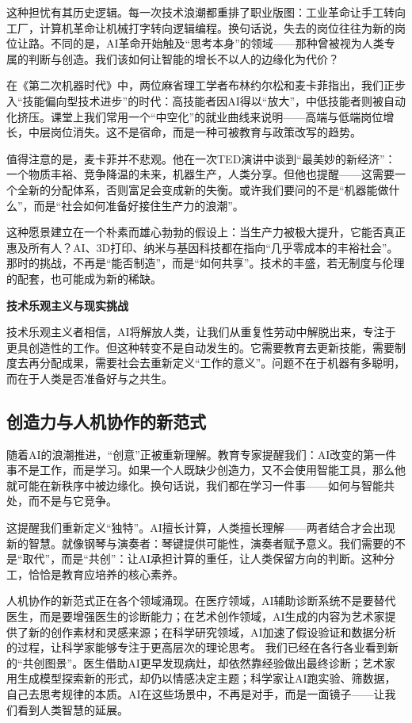 这种担忧有其历史逻辑。每一次技术浪潮都重排了职业版图：工业革命让手工转向工厂，计算机革命让机械打字转向逻辑编程。换句话说，失去的岗位往往为新的岗位让路。不同的是，AI革命开始触及“思考本身”的领域——那种曾被视为人类专属的判断与创造。我们该如何让智能的增长不以人的边缘化为代价？

在《第二次机器时代》中，两位麻省理工学者布林约尔松和麦卡菲指出，我们正步入“技能偏向型技术进步”的时代：高技能者因AI得以“放大”，中低技能者则被自动化挤压。课堂上我们常用一个“中空化”的就业曲线来说明——高端与低端岗位增长，中层岗位消失。这不是宿命，而是一种可被教育与政策改写的趋势。

值得注意的是，麦卡菲并不悲观。他在一次TED演讲中谈到“最美妙的新经济”：一个物质丰裕、竞争降温的未来，机器生产，人类分享。但他也提醒——这需要一个全新的分配体系，否则富足会变成新的失衡。或许我们要问的不是“机器能做什么”，而是“社会如何准备好接住生产力的浪潮”。

这种愿景建立在一个朴素而雄心勃勃的假设上：当生产力被极大提升，它能否真正惠及所有人？AI、3D打印、纳米与基因科技都在指向“几乎零成本的丰裕社会”。那时的挑战，不再是“能否制造”，而是“如何共享”。技术的丰盛，若无制度与伦理的配套，也可能成为新的稀缺。

{\bf 技术乐观主义与现实挑战}

技术乐观主义者相信，AI将解放人类，让我们从重复性劳动中解脱出来，专注于更具创造性的工作。但这种转变不是自动发生的。它需要教育去更新技能，需要制度去再分配成果，需要社会去重新定义“工作的意义”。问题不在于机器有多聪明，而在于人类是否准备好与之共生。

\subsection{创造力与人机协作的新范式}

随着AI的浪潮推进，“创意”正被重新理解。教育专家提醒我们：AI改变的第一件事不是工作，而是学习。如果一个人既缺少创造力，又不会使用智能工具，那么他就可能在新秩序中被边缘化。换句话说，我们都在学习一件事——如何与智能共处，而不是与它竞争。

这提醒我们重新定义“独特”。AI擅长计算，人类擅长理解——两者结合才会出现新的智慧。就像钢琴与演奏者：琴键提供可能性，演奏者赋予意义。我们需要的不是“取代”，而是“共创”：让AI承担计算的重任，让人类保留方向的判断。这种分工，恰恰是教育应培养的核心素养。

人机协作的新范式正在各个领域涌现。在医疗领域，AI辅助诊断系统不是要替代医生，而是要增强医生的诊断能力；在艺术创作领域，AI生成的内容为艺术家提供了新的创作素材和灵感来源；在科学研究领域，AI加速了假设验证和数据分析的过程，让科学家能够专注于更高层次的理论思考。
我们已经在各行各业看到新的“共创图景”。医生借助AI更早发现病灶，却依然靠经验做出最终诊断；艺术家用生成模型探索新的形式，却仍以情感决定主题；科学家让AI跑实验、筛数据，自己去思考规律的本质。AI在这些场景中，不再是对手，而是一面镜子——让我们看到人类智慧的延展。

